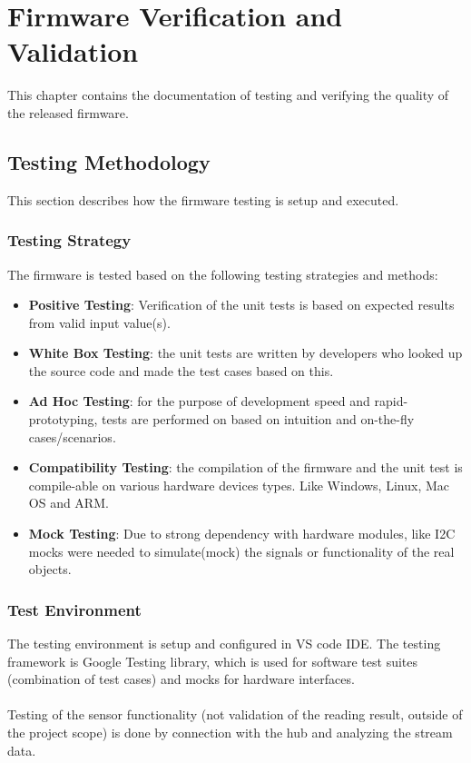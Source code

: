 \chapter{Firmware Verification and Validation}
\label{chapter:vv}
This chapter contains the documentation of testing and verifying the quality of the released firmware. 
\section{Testing Methodology}
This section describes how the firmware testing is setup and executed. 
\subsection{Testing Strategy}
The firmware is tested based on the following testing strategies and methods: 
\begin{itemize}
 \item \textbf{Positive Testing}: Verification of the unit tests is based on expected results from valid input value(s).
 \item \textbf{White Box Testing}: the unit tests are written by developers who looked up the source code and made the test cases based on this. 
 \item \textbf{Ad Hoc Testing}: for the purpose of development speed and rapid-prototyping, tests are performed on based on intuition and on-the-fly cases/scenarios. 
 \item \textbf{Compatibility Testing}: the compilation of the firmware and the unit test is compile-able on various hardware devices types. Like Windows, Linux, Mac OS and ARM. 
 \item \textbf{Mock Testing}: Due to strong dependency with hardware modules, like I2C mocks were needed to simulate(mock) the signals or functionality of the real objects.
\end{itemize}
\subsection{Test Environment}
The testing environment is setup and configured in VS code IDE. The testing framework is Google Testing library, which is used for software test suites (combination of test cases) and mocks for hardware interfaces.\\\\
Testing of the sensor functionality (not validation of the reading result, outside of the project scope) is done by connection with the hub and analyzing the stream data. 
